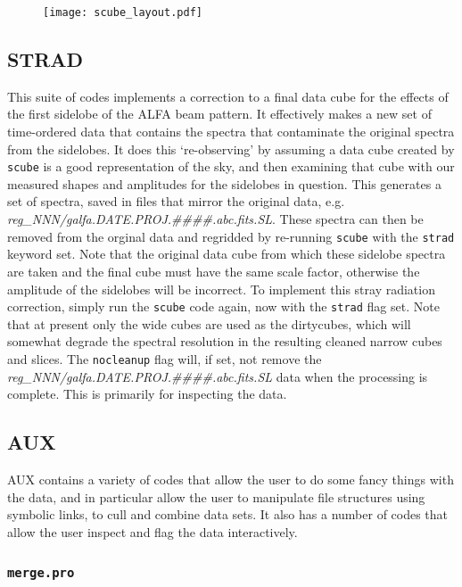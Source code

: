 \documentclass[11pt]{article}
\begin{document}
{\begin{figure}[htbp]
	\begin{center}
	\texttt{[image: scube\_layout.pdf]}
	\label{layout}
	\end{center}
\end{figure}

\subsection{STRAD}

This suite of codes implements a correction to a final data cube for the effects of the first sidelobe of the ALFA beam pattern. It effectively makes a new set of time-ordered data that contains the spectra that contaminate the original spectra from the sidelobes. It does this `re-observing' by assuming a data cube created by \texttt{scube} is a good representation of the sky, and then examining that cube with our measured shapes and amplitudes for the sidelobes in question. This generates a set of spectra, saved in files that mirror the original data, e.g. {\it reg\_NNN/galfa.DATE.PROJ.\#\#\#\#.abc.fits.SL}. These spectra can then be removed from the orginal data and regridded by re-running \texttt{scube} with the \texttt{strad} keyword set. Note that the original data cube from which these sidelobe spectra are taken and the final cube must have the same scale factor, otherwise the amplitude of the sidelobes will be incorrect. To implement this stray radiation correction, simply run the \texttt{scube} code again, now with the \texttt{strad} flag set. Note that at present only the wide cubes are used as the dirtycubes, which will somewhat degrade the spectral resolution in the resulting cleaned narrow cubes and slices. The \texttt{nocleanup} flag will, if set, not remove the {\it reg\_NNN/galfa.DATE.PROJ.\#\#\#\#.abc.fits.SL} data when the processing is complete. This is primarily for inspecting the data. 

\subsection{AUX}

AUX contains a variety of codes that allow the user to do some fancy things with the data, and in particular allow the user to manipulate file structures using symbolic links, to cull and combine data sets. It also has a number of codes that allow the user inspect and flag the data interactively.

\subsubsection{\texttt{merge.pro}}

}
\end{document}
